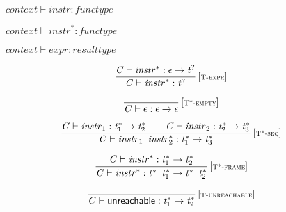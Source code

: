 \vspace{1ex}

$\boxed{{\mathit{context}} \vdash {\mathit{instr}} : {\mathit{functype}}}$

$\boxed{{\mathit{context}} \vdash {{\mathit{instr}}^\ast} : {\mathit{functype}}}$

$\boxed{{\mathit{context}} \vdash {\mathit{expr}} : {\mathit{resulttype}}}$

\vspace{1ex}

$$
\begin{array}{@{}c@{}}\displaystyle
\frac{
{\mathit{C}} \vdash {{\mathit{instr}}^\ast} : \epsilon \rightarrow {{\mathit{t}}^?}
}{
{\mathit{C}} \vdash {{\mathit{instr}}^\ast} : {{\mathit{t}}^?}
} \, {[\textsc{\scriptsize T{-}expr}]}
\qquad
\end{array}
$$

\vspace{1ex}

$$
\begin{array}{@{}c@{}}\displaystyle
\frac{
}{
{\mathit{C}} \vdash \epsilon : \epsilon \rightarrow \epsilon
} \, {[\textsc{\scriptsize T*{-}empty}]}
\qquad
\end{array}
$$

$$
\begin{array}{@{}c@{}}\displaystyle
\frac{
{\mathit{C}} \vdash {\mathit{instr}}_{{1}} : {{\mathit{t}}_{{1}}^\ast} \rightarrow {{\mathit{t}}_{{2}}^\ast}
 \qquad
{\mathit{C}} \vdash {\mathit{instr}}_{{2}} : {{\mathit{t}}_{{2}}^\ast} \rightarrow {{\mathit{t}}_{{3}}^\ast}
}{
{\mathit{C}} \vdash {\mathit{instr}}_{{1}}~\,{{\mathit{instr}}_{{2}}^\ast} : {{\mathit{t}}_{{1}}^\ast} \rightarrow {{\mathit{t}}_{{3}}^\ast}
} \, {[\textsc{\scriptsize T*{-}seq}]}
\qquad
\end{array}
$$

$$
\begin{array}{@{}c@{}}\displaystyle
\frac{
{\mathit{C}} \vdash {{\mathit{instr}}^\ast} : {{\mathit{t}}_{{1}}^\ast} \rightarrow {{\mathit{t}}_{{2}}^\ast}
}{
{\mathit{C}} \vdash {{\mathit{instr}}^\ast} : {{\mathit{t}}^\ast}~\,{{\mathit{t}}_{{1}}^\ast} \rightarrow {{\mathit{t}}^\ast}~\,{{\mathit{t}}_{{2}}^\ast}
} \, {[\textsc{\scriptsize T*{-}frame}]}
\qquad
\end{array}
$$

\vspace{1ex}

$$
\begin{array}{@{}c@{}}\displaystyle
\frac{
}{
{\mathit{C}} \vdash \mathsf{unreachable} : {{\mathit{t}}_{{1}}^\ast} \rightarrow {{\mathit{t}}_{{2}}^\ast}
} \, {[\textsc{\scriptsize T{-}unreachable}]}
\qquad
\end{array}
$$

